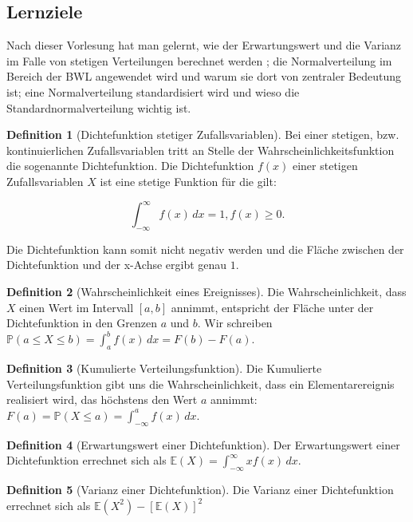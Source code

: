 \documentclass{article}
\theoremstyle{definition}
\newtheorem{definition}{Definition}
\theoremstyle{exercise}
\theoremstyle{solution}
\theoremstyle{lemma}
\begin{document}
\subsection{Lernziele}
Nach dieser Vorlesung hat man gelernt, wie der Erwartungswert und die Varianz im Falle von stetigen Verteilungen berechnet werden ; die Normalverteilung im Bereich der BWL angewendet wird und warum sie dort von zentraler Bedeutung ist; eine Normalverteilung standardisiert wird und wieso die Standardnormalverteilung wichtig ist.

\begin{definition}[Dichtefunktion stetiger Zufallsvariablen]
Bei einer stetigen, bzw. kontinuierlichen Zufallsvariablen tritt an Stelle der Wahrscheinlichkeitsfunktion die sogenannte Dichtefunktion. Die Dichtefunktion $f(x)$ einer stetigen Zufallsvariablen $X$ ist eine stetige Funktion für die gilt:

\[\int_{-\infty}^{\infty} f(x) \,dx=1, f(x)\geq 0. \]

Die Dichtefunktion kann somit nicht negativ werden und die Fläche zwischen der Dichtefunktion und der x-Achse ergibt genau $1$.
\end{definition}

\begin{definition}[Wahrscheinlichkeit eines Ereignisses]
Die Wahrscheinlichkeit, dass $X$ einen Wert im Intervall $[a,b]$ annimmt, entspricht der Fläche unter der Dichtefunktion in den Grenzen $a$ und $b$. Wir schreiben $\mathbb{P}(a\leq X \leq b)=\int_{a}^{b} f(x) \,dx=F(b)-F(a).$
\end{definition}

\begin{definition}[Kumulierte Verteilungsfunktion]
Die Kumulierte Verteilungsfunktion gibt uns die Wahrscheinlichkeit, dass ein Elementarereignis realisiert wird, das höchstens den Wert $a$ annimmt: $F(a)=\mathbb{P}(X\leq a)=\int_{-\infty}^{a} f(x) \, dx.$
\end{definition}

\begin{definition}[Erwartungswert einer Dichtefunktion]
Der Erwartungswert einer Dichtefunktion errechnet sich als $\mathbb{E}(X)=\int_{-\infty}^{\infty}xf(x) \, dx.$
\end{definition}

\begin{definition}[Varianz einer Dichtefunktion]
Die Varianz einer Dichtefunktion errechnet sich als $\mathbb{E}(X^2)-[ \mathbb{E}(X)]^2$
\end{definition}
\end{document}
